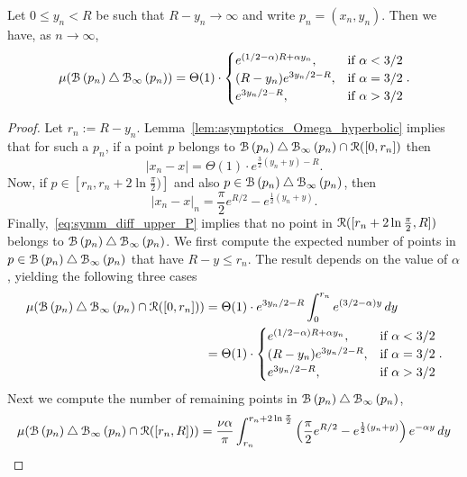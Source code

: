\begin{lemma}\label{lem:sym_diff_measure_H_P}
Let $0 \le y_n <R$ be such that $R - y_n \to \infty$ and write $p_n = (x_n, y_n)$. Then we have, as $n \to \infty$,
\[
	\mu ({\mathcal B}\left(p_n\right) \bigtriangleup {\mathcal B}_{\infty}\left(p_n\right) ) 
	= \Theta (1) \cdot \begin{cases} 
		e^{(1/2-\alpha)R + \alpha y_n}, & \mbox{if } \alpha < 3/2 \\
		(R-y_n) e^{3y_n/2 - R}, & \mbox{if }\alpha = 3/2\\
		e^{3y_n/2 - R}, &  \mbox{if } \alpha > 3/2 
	\end{cases}.
\]
\end{lemma}

\begin{proof}
Let $r_n := R - y_n$. Lemma~\ref{lem:asymptotics_Omega_hyperbolic} implies that for such a $p_n$, if a point $p$ belongs to ${\mathcal B}\left(p_n\right) \bigtriangleup {\mathcal B}_{\infty}\left(p_n\right) \cap {\mathcal R} ([0,r_n])$ then 
\[
	|x_n - x| = \Theta(1) \cdot e^{\frac{3}{2} (y_n + y) - R}.
\]
Now, if $p \in [r_n, r_n + 2 \ln \frac{\pi}{2})]$ and also $p \in {\mathcal B}\left(p_n\right) \bigtriangleup {\mathcal B}_{\infty}\left(p_n\right)$, then 
\[
	|x_n-x|_n =\frac{\pi}{2} e^{R/2} - e^{\frac{1}{2} (y_n + y)}.
\]
Finally,~\eqref{eq:symm_diff_upper_P} implies that no point in ${\mathcal R} ([r_n+2\ln \frac{\pi}{2},R])$ belongs to ${\mathcal B}\left(p_n\right) \bigtriangleup {\mathcal B}_{\infty}\left(p_n\right)$. We first compute the expected number of points in $p \in {\mathcal B}\left(p_n\right) \bigtriangleup {\mathcal B}_{\infty}\left(p_n\right)$ that have $R - y \le r_n$. The result depends on the value of $\alpha$, yielding the following three cases
\begin{align*}
	\mu ({\mathcal B}\left(p_n\right) \bigtriangleup {\mathcal B}_{\infty}\left(p_n\right) \cap {\mathcal R} ([0,r_n])) 
	&= \Theta(1) \cdot e^{3y_n/2 - R}\int_0^{r_n} e^{(3/2-\alpha) y} \, dy \\
	&= \Theta(1)\cdot \begin{cases} e^{(1/2-\alpha)R + \alpha y_n}, & \mbox{if } \alpha < 3/2 \\
		(R - y_n) e^{3y_n/2 - R}, & \mbox{if }\alpha = 3/2\\
		e^{3y_n/2 - R}, &  \mbox{if } \alpha > 3/2
	\end{cases}.
\end{align*}
Next we compute the number of remaining points in ${\mathcal B}\left(p_n\right) \bigtriangleup {\mathcal B}_{\infty}\left(p_n\right)$, 
\begin{align*}
	\mu (\BallHyp{p_n} \bigtriangleup \BallPo{p_n} \cap \Rcal ([r_n, R])) 
	&= \frac{\nu\alpha}{\pi} \int_{r_n}^{r_n + 2 \ln \frac{\pi}{2}} 
		\left(\frac{\pi}{2} e^{R/2} - e^{\frac{1}{2} (y_n + y)}\right)e^{-\alpha y} \, dy \\

\end{align*}
\end{proof}
